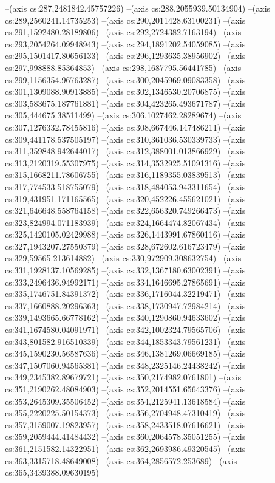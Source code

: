 --(axis cs:287,2481842.45757226)
--(axis cs:288,2055939.50134904)
--(axis cs:289,2560241.14735253)
--(axis cs:290,2011428.63100231)
--(axis cs:291,1592480.28189806)
--(axis cs:292,2724382.7163194)
--(axis cs:293,2054264.09948943)
--(axis cs:294,1891202.54059085)
--(axis cs:295,1501417.80656133)
--(axis cs:296,1293635.38956902)
--(axis cs:297,998888.85364853)
--(axis cs:298,1687795.56441785)
--(axis cs:299,1156354.96763287)
--(axis cs:300,2045969.09083358)
--(axis cs:301,1309088.90913885)
--(axis cs:302,1346530.20706875)
--(axis cs:303,583675.187761881)
--(axis cs:304,423265.493671787)
--(axis cs:305,444675.38511499)
--(axis cs:306,1027462.28289674)
--(axis cs:307,1276332.78455816)
--(axis cs:308,667446.147486211)
--(axis cs:309,441178.537505197)
--(axis cs:310,361036.530339733)
--(axis cs:311,359848.942644017)
--(axis cs:312,388001.013866929)
--(axis cs:313,2120319.55307975)
--(axis cs:314,3532925.51091316)
--(axis cs:315,1668211.78606755)
--(axis cs:316,1189355.03839513)
--(axis cs:317,774533.518755079)
--(axis cs:318,484053.943311654)
--(axis cs:319,431951.171165565)
--(axis cs:320,452226.455621021)
--(axis cs:321,646648.558764158)
--(axis cs:322,656320.749266473)
--(axis cs:323,824994.071183939)
--(axis cs:324,1664474.82067434)
--(axis cs:325,1420105.02429988)
--(axis cs:326,1443991.67860116)
--(axis cs:327,1943207.27550379)
--(axis cs:328,672602.616723479)
--(axis cs:329,59565.213614882)
--(axis cs:330,972909.308632754)
--(axis cs:331,1928137.10569285)
--(axis cs:332,1367180.63002391)
--(axis cs:333,2496436.94992171)
--(axis cs:334,1646695.27865691)
--(axis cs:335,1746751.84391372)
--(axis cs:336,1716044.32219471)
--(axis cs:337,1660888.20296363)
--(axis cs:338,1730947.72984214)
--(axis cs:339,1493665.66778162)
--(axis cs:340,1290860.94633602)
--(axis cs:341,1674580.04091971)
--(axis cs:342,1002324.79565706)
--(axis cs:343,801582.916510339)
--(axis cs:344,1853343.79561231)
--(axis cs:345,1590230.56587636)
--(axis cs:346,1381269.06669185)
--(axis cs:347,1507060.94565381)
--(axis cs:348,2325146.24438242)
--(axis cs:349,2345382.89679721)
--(axis cs:350,2174982.0761801)
--(axis cs:351,2190262.48084903)
--(axis cs:352,2014551.65643376)
--(axis cs:353,2645309.35506452)
--(axis cs:354,2125941.13618584)
--(axis cs:355,2220225.50154373)
--(axis cs:356,2704948.47310419)
--(axis cs:357,3159007.19823957)
--(axis cs:358,2433518.07616621)
--(axis cs:359,2059444.41484432)
--(axis cs:360,2064578.35051255)
--(axis cs:361,2151582.14322951)
--(axis cs:362,2693986.49320545)
--(axis cs:363,3315718.48649008)
--(axis cs:364,2856572.253689)
--(axis cs:365,3439388.09630195)
